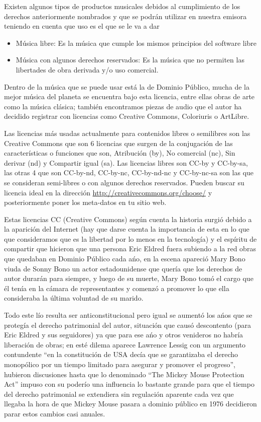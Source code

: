 \begin{multicols}{2}
Existen algunos tipos de productos musicales debidos al cumplimiento de los derechos anteriormente nombrados y que se podrán utilizar en nuestra emisora teniendo en cuenta que uso es el que se le va a dar
\begin{itemize}
\item Música libre: Es la música que cumple los mismos principios del software libre
\item Música con algunos derechos reservados: Es la música que no permiten las libertades de obra derivada y/o uso comercial.
\end{itemize}
Dentro de la música que se puede usar está la de Dominio Público, mucha de la mejor música del planeta se encuentra bajo esta licencia, entre ellas obras de arte como la música clásica; también encontramos piezas de audio que el autor ha decidido registrar con licencias como Creative Commons, Coloriuris o ArtLibre.

Las licencias más usadas actualmente para contenidos libres o semilibres son las Creative Commons que son 6 licencias que surgen de la conjugación de las características o funciones que son, Atribución (by), No comercial (nc), Sin derivar (nd) y Compartir igual (sa). Las licencias libres\cite {ref2} son CC-by y CC-by-sa, las otras 4 que son CC-by-nd, CC-by-nc, CC-by-nd-nc y CC-by-nc-sa son las que se consideran semi-libres o con algunos derechos reservados. Pueden buscar su licencia ideal en la dirección \url{http://creativecommons.org/choose/} y posteriormente poner los meta-datos en tu sitio web.

Estas licencias CC (Creative Commons) según cuenta la historia surgió debido a la aparición del Internet (hay que darse cuenta la importancia de esta en lo que que consideramos que es la libertad por lo menos en la tecnología) y el espíritu de compartir que hicieron que una persona Eric Eldred fuera subiendo a la red obras que quedaban en Dominio Público cada ańo, en la escena apareció Mary Bono viuda de Sonny Bono un actor estadounidense que quería que los derechos de autor durarán para siempre, y luego de su muerte, Mary Bono tomó el cargo que él tenía en la cámara de representantes y comenzó a promover lo que ella consideraba la última voluntad de su marido.

Todo este lío resulta ser anticonstitucional pero igual se aumentó los ańos que se protegía el derecho patrimonial del autor, situación que causó descontento (para Eric Eldred y sus seguidores) ya que para ese ańo y otros venideros no habría liberación de obras; en esté dilema aparece Lawrence Lessig con un argumento contundente ``en la constitución de USA decía que se garantizaba el derecho monopólico por un tiempo limitado para asegurar y promover el progreso'', hubieron discusiones hasta que lo denominado ``The Mickey Mouse Protection Act''\cite {ref3} impuso con su poderío una influencia lo bastante grande para que el tiempo del derecho patrimonial se extendiera sin regulación aparente cada vez que llegaba la hora de que Mickey Mouse pasara a dominio público\cite {ref4} en 1976 decidieron parar estos cambios casi anuales. 


\end{multicols}
